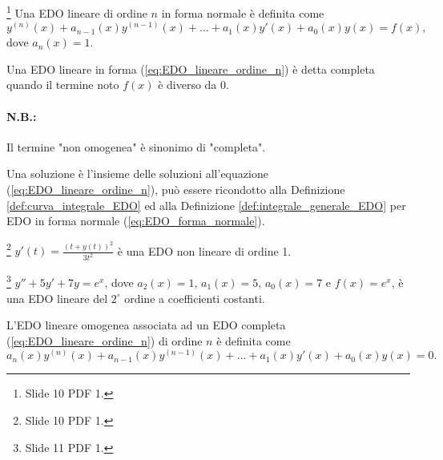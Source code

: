 \begin{definition}\label{def:EDO_lineare_completa_ordine_n_forma_normale}\footnote{Slide 10 PDF 1.}
    Una EDO lineare di ordine $n$ in forma normale è definita come
    \begin{equation}\label{eq:EDO_lineare_ordine_n_forma_normale}
        y^{(n)}(x)+a_{n-1}(x)y^{(n-1)}(x)+\hdots+a_1(x)y'(x)+a_0(x)y(x)=f(x),
    \end{equation}
    dove $a_n(x)=1$.
\end{definition}

\begin{definition}
    Una EDO lineare in forma (\ref{eq:EDO_lineare_ordine_n}) è detta completa quando il termine noto $f(x)$ è diverso da 0.
\end{definition}

\paragraph{N.B.:} Il termine "non omogenea" è sinonimo di "completa".

Una soluzione è l'insieme delle soluzioni all'equazione (\ref{eq:EDO_lineare_ordine_n}), può essere ricondotto alla Definizione \ref{def:curva_integrale_EDO} ed alla Definizione \ref{def:integrale_generale_EDO} per EDO in forma normale (\ref{eq:EDO_forma_normale}).

\begin{example}
    \footnote{Slide 10 PDF 1.} $y'(t)=\frac{(t+y(t))^2}{3t^2}$ è una EDO non lineare di ordine 1. 
\end{example}

\begin{example}
    \footnote{Slide 11 PDF 1.} $y''+5y'+7y=e^x$, dove $a_2(x)=1,\, a_1(x)=5,\, a_0(x)=7$ e $f(x)=e^x$, è una EDO lineare del $2^\circ$ ordine a coefficienti costanti.
\end{example}

\begin{definition}\label{def:EDO_lineare_omogenea_ordine_n}
    L'EDO lineare omogenea associata ad un EDO completa (\ref{eq:EDO_lineare_ordine_n}) di ordine $n$ è definita come
    \begin{equation}\label{eq:EDO_lineare_omogenea_associata_ordine_n}
        a_n(x)y^{(n)}(x)+a_{n-1}(x)y^{(n-1)}(x)+\hdots+a_1(x)y'(x)+a_0(x)y(x)= 0.
    \end{equation}
\end{definition}

